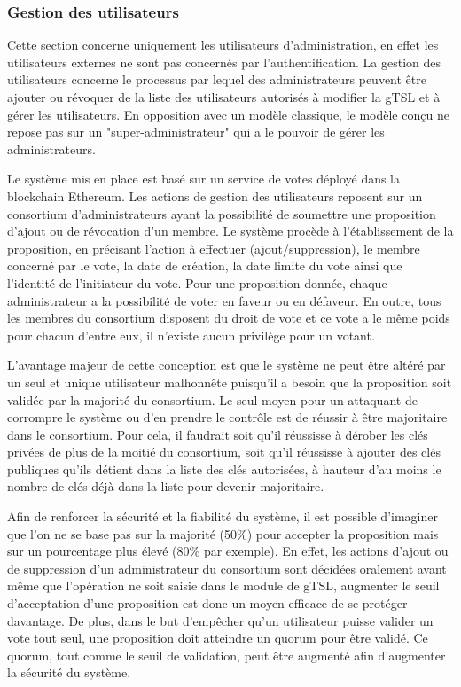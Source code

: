 \documentclass{tnreport}
\begin{document}
\subsubsection{Gestion des utilisateurs}

Cette section concerne uniquement les utilisateurs d'administration, en effet les utilisateurs externes ne sont pas concernés par l'authentification.
La gestion des utilisateurs concerne le processus par lequel des administrateurs peuvent être ajouter ou révoquer de la liste des utilisateurs autorisés à modifier la gTSL et à gérer les utilisateurs. 
En opposition avec un modèle classique, le modèle conçu ne repose pas sur un "super-administrateur" qui a le pouvoir de gérer les administrateurs. 

Le système mis en place est basé sur un service de votes déployé dans la blockchain Ethereum. Les actions de gestion des utilisateurs reposent sur un consortium d'administrateurs ayant la possibilité de soumettre une proposition d'ajout ou de révocation d'un membre. Le système procède à l'établissement de la proposition, en précisant l'action à effectuer (ajout/suppression), le membre concerné par le vote, la date de création, la date limite du vote ainsi que l'identité de l'initiateur du vote. Pour une proposition donnée, chaque administrateur a la possibilité de voter en faveur ou en défaveur. En outre, tous les membres du consortium disposent du droit de vote et ce vote a le même poids pour chacun d'entre eux, il n'existe aucun privilège pour un votant.

L'avantage majeur de cette conception est que le système ne peut être altéré par un seul et unique utilisateur malhonnête puisqu'il a besoin que la proposition soit validée par la majorité du consortium. Le seul moyen pour un attaquant de corrompre le système ou d'en prendre le contrôle est de réussir à être majoritaire dans le consortium. Pour cela, il faudrait soit qu'il réussisse à dérober les clés privées de plus de la moitié du consortium, soit qu'il réussisse à ajouter des clés publiques qu'ils détient dans la liste des clés autorisées, à hauteur d'au moins le nombre de clés déjà dans la liste pour devenir majoritaire. 

Afin de renforcer la sécurité et la fiabilité du système, il est possible d'imaginer que l'on ne se base pas sur la majorité (50\%) pour accepter la proposition mais sur un pourcentage plus élevé (80\% par exemple). En effet, les actions d'ajout ou de suppression d'un administrateur du consortium sont décidées oralement avant même que l'opération ne soit saisie dans le module de gTSL, augmenter le seuil d'acceptation d'une proposition est donc un moyen efficace de se protéger davantage. De plus, dans le but d'empêcher qu'un utilisateur puisse valider un vote tout seul, une proposition doit atteindre un quorum pour être validé. Ce quorum, tout comme le seuil de validation, peut être augmenté afin d'augmenter la sécurité du système.
\end{document}
